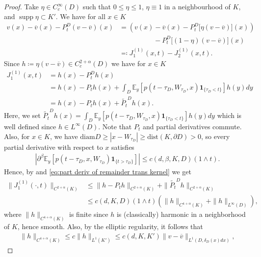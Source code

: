 \documentclass[12pt,a4paper,onecolumn]{amsart}
\DeclareMathOperator\supp{supp}
\theoremstyle{definition}
\newcommand{\ex}{\mathbb{E}}
\newcommand{\1}{\mathbf 1}
\newcommand{\LLL}{L^1(D,\de(x)dx)}
\newcommand{\de}{\delta_D}
\newcommand{\wt}{\widetilde}
\newcommand{\diam}{\textrm{diam}}
\newcommand{\dist}{\textrm{dist}}
\numberwithin{equation}{section}
\begin{document}
\begin{proof}
    Take $\eta\in C_c^\infty(D)$ such that $0\le \eta\le 1$, $\eta\equiv 1$ in a neighbourhood of $K$, and $\supp \eta \subset K'$. We have for all $x\in K$
    \begin{align*}
        v(x)-\overline v(x)-P_t^D(v-\overline v)(x)&= \left(v(x)-\overline v(x)-P_t^D\big[\eta(v-\overline v)\big](x)\right)\\&\hspace{5em}-P_t^D\big[(1-\eta)(v-\overline v)\big](x)\\
        &\eqqcolon J^{(1)}_1(x,t)-J^{(1)}_2(x,t).
    \end{align*}
       Since $h\coloneqq \eta (v-\overline v)\in C^{2+\alpha}_c(D)$ we have for $x\in K$
    \begin{align*}
        J^{(1)}_1(x,t)&=h(x)-P_t^Dh(x)\\
        &=h(x)-P_th(x)+\int_D \ex_y\left[p(t-\tau_D,W_{\tau_D},x)\1_{\{\tau_D<t\}}\right]h(y)dy\\
        &=h(x)-P_th(x)+\wt{P_t}^Dh(x).
    \end{align*}
    Here, we set $\wt{P_t}^Dh(x)=\int_D \ex_y\left[p(t-\tau_D,W_{\tau_D},x)\1_{\{\tau_D<t\}}\right]h(y)dy$ which is well defined since $h\in L^\infty(D)$.
    Note that $P_t$ and partial derivatives commute. Also, for $x\in K$, we have $\diam D\ge |x-W_{\tau_D}|\ge \dist(K,\partial D)>0$, so every partial derivative with respect to $x$ satisfies
    \begin{align}\label{eq:part deriv of remainder trans kernel}
    |\partial^\beta \ex_y\left[p(t-\tau_D,x,W_{\tau_D})\1_{\{t>\tau_D\}}\right]|\le c(d,\beta,K,D)(1\wedge t).
    \end{align}
    Hence, by \cite[(13.3)]{bernstein} and \eqref{eq:part deriv of remainder trans kernel} we get
    \begin{align}\label{eq:J^1_1 bound eq1}
        \|J^{(1)}_1(\cdot,t)\|_{C^{2+\alpha}(K)}&\le \|h-P_th\|_{C^{2+\alpha}(K)}+\|\wt{P_t}^Dh\|_{C^{2+\alpha}(K)}\nonumber\\
        &\le c(d,K,D)(1\wedge t)\left(\| h\|_{C^{4+\alpha}(K)}+\|h\|_{L^\infty(D)}\right),
    \end{align}
    where $\| h\|_{C^{4+\alpha}(K)}$ is finite since $h$ is (classically) harmonic in  a neighborhood of $K$, hence smooth.
    Also, by the elliptic regularity, it follows that
    \begin{align}\label{eq:J^1_1 bound eq2}
        \|h\|_{C^{4+\alpha}(K)}\le c\| h\|_{L^1(K')}\le c(d,K,K')\|v-\overline v\|_{\LLL},
    \end{align}

\end{proof}
\end{document}
